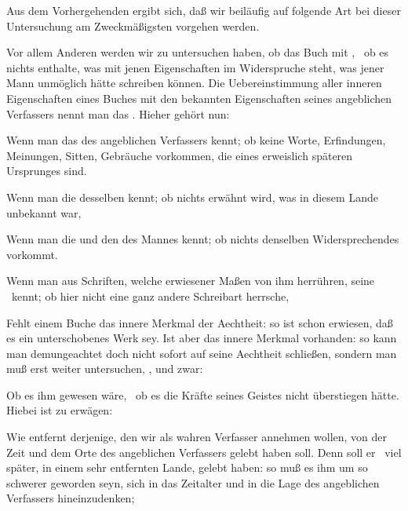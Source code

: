 Aus dem Vorhergehenden ergibt sich, daß wir beiläufig auf folgende Art bei dieser Untersuchung am Zweckmäßigsten vorgehen werden.
\begin{aufza}
\item  Vor allem Anderen werden wir zu untersuchen haben, ob das Buch mit , \dh\ ob es nichts enthalte, was mit jenen Eigenschaften im Widerspruche steht, was jener Mann unmöglich hätte schreiben können. Die Uebereinstimmung aller inneren Eigenschaften eines Buches mit den bekannten Eigenschaften seines angeblichen Verfassers nennt man das . Hieher gehört nun:
\begin{aufzb}
\item  Wenn man das  des angeblichen Verfassers kennt; ob keine Worte, Erfindungen, Meinungen, Sitten, Gebräuche vorkommen, die eines erweislich späteren Ursprunges sind.~
\item  Wenn man die  desselben kennt; ob nichts erwähnt wird, was in diesem Lande unbekannt war, \udgl\ 
\item Wenn man die  und den  des Mannes kennt; ob nichts denselben Widersprechendes vorkommt.
\item  Wenn man aus Schriften, welche erwiesener Maßen von ihm herrühren, seine \RWbet{Schreibart} \udgl\  kennt; ob hier nicht eine ganz andere Schreibart herrsche, \usw
\end{aufzb}
\item  Fehlt einem Buche das innere Merkmal der Aechtheit: so ist schon erwiesen, daß es ein unterschobenes Werk sey. Ist aber das innere Merkmal vorhanden: so kann man demungeachtet doch nicht sofort auf seine Aechtheit schließen, sondern man muß erst weiter untersuchen, , und zwar:
\begin{aufzb}
\item  Ob es ihm  gewesen wäre, \dh\ ob es die Kräfte seines Geistes nicht überstiegen hätte. Hiebei ist zu erwägen:
\begin{aufzc}
\item Wie entfernt derjenige, den wir als wahren Verfasser annehmen wollen, von der Zeit und dem Orte des angeblichen Verfassers gelebt haben soll. Denn soll er \zB\ viel später, in einem sehr entfernten Lande, gelebt haben: so muß es ihm um so schwerer geworden seyn, sich in das Zeitalter und in die Lage des angeblichen Verfassers hineinzudenken;

\end{aufzc}
\end{aufzb}
\end{aufza}
